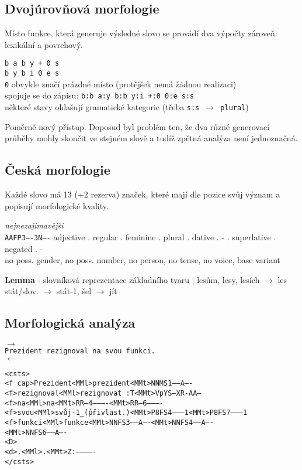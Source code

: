 \documentclass[a4paper]{article}
\newcommand{\imwc}[2]{\textbf{#1} - #2}
\begin{document}
\subsection*{Dvojúrovňová morfologie}
Místo funkce, která generuje výsledné slovo se provádí dva výpočty zároveň: lexikální a povrchový.
\begin{center}
	\texttt{b a b y + 0 s} \\
	\texttt{b y b i 0 e s} \\
	\texttt{0} obvykle značí prázdné místo (protějšek nemá žádnou realizaci) \\
	spojuje se do zápisu: \texttt{b:b a:y b:b y:i +:0 0:e s:s} \\
	některé stavy ohlašují gramatické kategorie (třeba \texttt{s:s $\rightarrow$ plural})
\end{center}
Poměrně nový přístup. Doposud byl problém ten, že dva různé generovací průběhy mohly skončit ve stejném slově a tudíž zpětná analýza není jednoznačná.

\subsection*{Česká morfologie}
Každé slovo má 13 (+2 rezerva) značek, které mají dle pozice svůj význam a popisují morfologické kvality.
\begin{center}
\textit{nejnezajímavější}\\
\texttt{AAFP3----3N----}
adjective . regular . feminine . plural . dative . - . superlative . negated . - \\
no poss. gender, no poss. number, no person, no tense, no voice, base variant
\end{center} 
\imwc{Lemma}{slovníková reprezentace základního tvaru | lesům, lesy, lesích $\rightarrow$ les} \\
\text{}\hspace{1.5cm} stát/slov. $\rightarrow$ stát-1, šel $\rightarrow$ jít

\subsection*{Morfologická analýza}
\begin{center}
$\rightarrow$ \\
\texttt{Prezident rezignoval na svou funkci.} \\

$\leftarrow$ \\
\end{center}
\texttt{<csts>\\
<f cap>Prezident<MMl>prezident<MMt>NNMS1-----A----\\
<f>rezignoval<MMl>rezignovat\_:T<MMt>VpYS---XR-AA---\\
<f>na<MMl>na<MMt>RR--4----------<MMt>RR--6----------\\ <f>svou<MMl>svůj-1\_\^(přivlast.)<MMt>P8FS4---------1<MMt>P8FS7---------1\\
<f>funkci<MMl>funkce<MMt>NNFS3-----A----<MMt>NNFS4-----A----\\
<MMt>NNFS6-----A----\\
<D>\\
<d>.<MMl>.<MMt>Z:-------------\\
</csts>}
\end{document}
